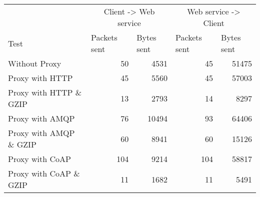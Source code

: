 \begin{tabular}{lrrrr}
\hline
\multicolumn{1}{l}{}                  & \multicolumn{2}{c}{Client -> Web service}                           & \multicolumn{2}{c}{Web service -> Client}                           \\
\multicolumn{1}{l}{Test} & \multicolumn{1}{l}{Packets sent} & \multicolumn{1}{l}{Bytes sent} & \multicolumn{1}{l}{Packets sent} & \multicolumn{1}{l}{Bytes sent} \\ \hline
Without Proxy                   & 50             & 4531           & 45             & 51475          \\
Proxy with HTTP                 & 45             & 5560           & 45             & 57003          \\
Proxy with HTTP \& GZIP         & 13             & 2793           & 14             & 8297           \\
Proxy with AMQP                 & 76             & 10494          & 93             & 64406          \\
Proxy with AMQP \& GZIP         & 60             & 8941           & 60             & 15126          \\
Proxy with CoAP                 & 104            & 9214           & 104            & 58817          \\
Proxy with CoAP \& GZIP         & 11             & 1682           & 11             & 5491           \\
\end{tabular}